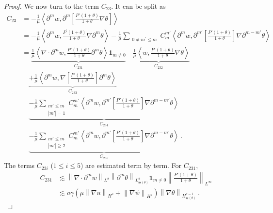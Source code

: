 \documentclass[10pt,a4paper]{amsart}
\def\no{\nonumber}
\def\w{\mathfrak{w}}
\begin{document}
\begin{proof}
We now turn to the term $C_{23}$. It can be split as
\begin{align}\label{gpsi-eq11}
\no C_{23}&=-\frac{1}{\mu} \left\langle \partial^m w, \partial^m \left[ \frac{P'(1+\theta)}{1+\theta} \nabla \theta \right] \right\rangle\\
\no & = -\frac{1}{\mu} \left\langle \partial^m w, \frac{P^\prime(1+\theta)}{1+\theta} \nabla \partial^m \theta \right\rangle -\frac{1}{\mu} \sum_{\substack{0\neq m^\prime \leq m}} C_m^{m'} \left\langle \partial^m w, \partial^{m'} \left[\frac{P'(1+\theta)}{1+\theta}\right] \nabla \partial^{m-m'} \theta \right\rangle \\
\no &= \underset{C_{231}}{\underbrace{\frac{1}{\mu} \left\langle \nabla \cdot \partial^m w, \frac{P'(1+\theta)}{1+\theta} \partial^m \theta \right\rangle {\mathbf{1}}_{m\neq 0} }} \ \underset{C_{232}}{\underbrace{ -\frac{1}{\mu} \left\langle w, \frac{P'(1+\theta)}{1+\theta} \nabla \theta \right\rangle}} \quad  \\
\no & \quad \underset{C_{233}}{\underbrace{+\frac{1}{\mu} \left\langle \partial^m w, \nabla \left[\frac{P'(1+\theta)}{1+\theta}\right] \partial^m \theta \right\rangle }} \\
\no &\quad \underset{C_{234}}{\underbrace{-\frac{1}{\mu} \sum_{\substack{m' \leq m \\ |m'| = 1}} C_m^{m'} \left\langle \partial^m w, \partial^{m'} \left[\frac{P'(1+\theta)}{1+\theta}\right] \nabla \partial^{m-m'} \theta \right\rangle}} \\
& \quad \underset{C_{235}}{\underbrace{ -\frac{1}{\mu} \sum_{\substack{m' \leq m \\ |m'| \geq 2}} C_m^{m'} \left\langle \partial^m w, \partial^{m'} \left[\frac{P'(1+\theta)}{1+\theta}\right] \nabla \partial^{m-m'} \theta \right\rangle}} \,.
\end{align}
The terms $C_{23i}$ ($1 \le i \le 5$) are estimated term by term. For $C_{231}$,
\begin{equation}\label{gpsi-eq12}
\begin{aligned}
C_{231} & \lesssim \left\| \nabla \cdot \partial^m w \right\|_{L^2} \left\| \partial^m \theta \right\|_{L^2_{\w (\theta)}}\mathbf{1}_{m\neq 0} \left\| \frac{P'(1+\theta)}{1+\theta} \right\|_{L^\infty} \\
& \lesssim a \gamma \left( \mu \left\| \nabla u \right\|_{H^s} + \left\| \nabla \psi \right\|_{H^s} \right) \left\| \nabla \theta \right\|_{H^{s-1}_{\w (\theta)}} \,.
\end{aligned}
\end{equation}

\end{proof}
\end{document}
